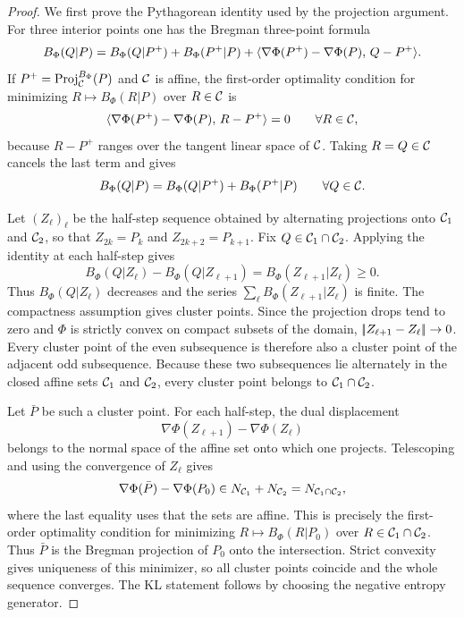 \begin{proof}
	We first prove the Pythagorean identity used by the projection argument. For three interior points one has the Bregman three-point formula
	\[
		B_\Phi(Q|P)
		=
		B_\Phi(Q|P^+)
		+
		B_\Phi(P^+|P)
		+
		\langle \nabla\Phi(P^+)-\nabla\Phi(P),\,Q-P^+\rangle.
	\]
	If $P^+=\operatorname{Proj}_{\mathcal{C}}^{B_\Phi}(P)$ and $\mathcal{C}$ is affine, the first-order optimality condition for minimizing $R\mapsto B_\Phi(R|P)$ over $R\in\mathcal{C}$ is
	\[
		\langle \nabla\Phi(P^+)-\nabla\Phi(P),\,R-P^+\rangle=0
		\qquad \forall R\in\mathcal{C},
	\]
	because $R-P^+$ ranges over the tangent linear space of $\mathcal{C}$. Taking $R=Q\in\mathcal{C}$ cancels the last term and gives
	\[
		B_\Phi(Q|P)=B_\Phi(Q|P^+)+B_\Phi(P^+|P)
		\qquad\forall Q\in\mathcal{C}.
	\]

	Let $(Z_\ell)_\ell$ be the half-step sequence obtained by alternating projections onto $\mathcal{C}_1$ and $\mathcal{C}_2$, so that $Z_{2k}=P_k$ and $Z_{2k+2}=P_{k+1}$. Fix $Q\in\mathcal{C}_1\cap\mathcal{C}_2$. Applying the identity at each half-step gives
	\[
		B_\Phi(Q|Z_\ell)-B_\Phi(Q|Z_{\ell+1})
		=
		B_\Phi(Z_{\ell+1}|Z_\ell)\geq0.
	\]
	Thus $B_\Phi(Q|Z_\ell)$ decreases and the series $\sum_\ell B_\Phi(Z_{\ell+1}|Z_\ell)$ is finite. The compactness assumption gives cluster points. Since the projection drops tend to zero and $\Phi$ is strictly convex on compact subsets of the domain, $|\!| Z_{\ell+1}-Z_\ell |\!|\to0$. Every cluster point of the even subsequence is therefore also a cluster point of the adjacent odd subsequence. Because these two subsequences lie alternately in the closed affine sets $\mathcal{C}_1$ and $\mathcal{C}_2$, every cluster point belongs to $\mathcal{C}_1\cap\mathcal{C}_2$.

	Let $\bar P$ be such a cluster point. For each half-step, the dual displacement
	\[
		\nabla\Phi(Z_{\ell+1})-\nabla\Phi(Z_\ell)
	\]
	belongs to the normal space of the affine set onto which one projects. Telescoping and using the convergence of $Z_\ell$ gives
	\[
		\nabla\Phi(\bar P)-\nabla\Phi(P_0)
		\in
		N_{\mathcal{C}_1}+N_{\mathcal{C}_2}
		=
		N_{\mathcal{C}_1\cap\mathcal{C}_2},
	\]
	where the last equality uses that the sets are affine. This is precisely the first-order optimality condition for minimizing $R\mapsto B_\Phi(R|P_0)$ over $R\in\mathcal{C}_1\cap\mathcal{C}_2$. Thus $\bar P$ is the Bregman projection of $P_0$ onto the intersection. Strict convexity gives uniqueness of this minimizer, so all cluster points coincide and the whole sequence converges. The KL statement follows by choosing the negative entropy generator.
\end{proof}

